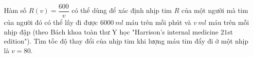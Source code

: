 \begin{bt}%
	Hàm số $R(v)=\dfrac{600}{v}$ có thể dùng để xác định nhịp tim $R$ của một người mà tim của người đó có thể lấy đi được $6000~ml$ máu trên mỗi phút và $v~ml$ máu trên mỗi nhịp đập (theo Bách khoa toàn thư Y học "Harrison's internal medicine  $21$st edition"). Tìm tốc độ thay đổi của nhịp tim khi lượng máu tim đẩy đi ở một nhịp là $v=80$.
\end{bt}
